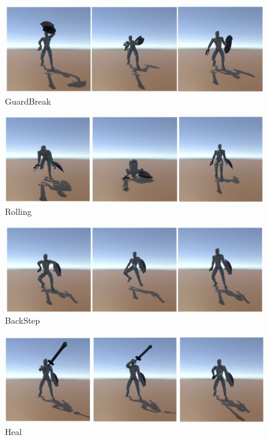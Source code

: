 \documentclass[a4paper,12pt,oneside,openany,titlepage]{jreport}
\begin{document}
\begin{figure}[htbp]
  \begin{center}
    \includegraphics[width=13cm]{FrameImage/GuardBreak.png}
    \caption{GuardBreak}
    \label{}
  \end{center}
\end{figure}

\begin{figure}[h]
  \begin{center}
    \includegraphics[width=13cm]{FrameImage/Rolling.png}
    \caption{Rolling}
    \label{}
  \end{center}
\end{figure}

\begin{figure}[h]
  \begin{center}
    \includegraphics[width=13cm]{FrameImage/BackStep.png}
    \caption{BackStep}
    \label{}
  \end{center}
\end{figure}

\begin{figure}[h]
  \begin{center}
    \includegraphics[width=13cm]{FrameImage/Heal.png}
    \caption{Heal}
    \label{}
  \end{center}
\end{figure}
\end{document}
